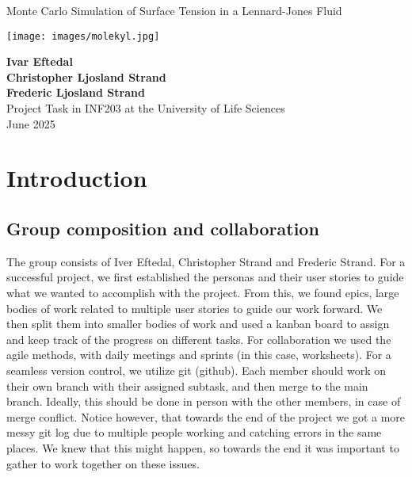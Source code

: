 \documentclass{article}
\begin{document}
\begin{titlepage}
    \centering
    
    \Huge
    \textbf{}

    \vspace{1.5cm}
    \LARGE
    Monte Carlo Simulation of Surface Tension in a Lennard-Jones Fluid

    \vspace{1.5cm}

    \texttt{[image: images/molekyl.jpg]}\\[1cm]
    \cite{uh_methanediol_2021}
    \vfill

    \Large
    \textbf{Ivar Eftedal}\\
    \textbf{Christopher Ljosland Strand}\\
    \textbf{Frederic Ljosland Strand}\\
    \vspace{0.5cm}
    Project Task in INF203 at the University of Life Sciences\\
    \vspace{0.5cm}
    June 2025\\

    \vspace{1cm}

\end{titlepage}

\section{Introduction}

\subsection*{Group composition and collaboration}

The group consists of Iver Eftedal, Christopher Strand and Frederic Strand. For a successful project, we first established the personas and their user stories to guide what we wanted to accomplish with the project. From this, we found epics, large bodies of work related to multiple user stories to guide our work forward. We then split them into smaller bodies of work and used a kanban board to assign and keep track of the progress on different tasks. For collaboration we used the agile methods, with daily meetings and sprints (in this case, worksheets). For a seamless version control, we utilize git (github). Each member should work on their own branch with their assigned subtask, and then merge to the main branch. Ideally, this should be done in person with the other members, in case of merge conflict. Notice however, that towards the end of the project we got a more messy git log due to multiple people working and catching errors in the same places. We knew that this might happen, so towards the end it was important to gather to work together on these issues. 
\end{document}
